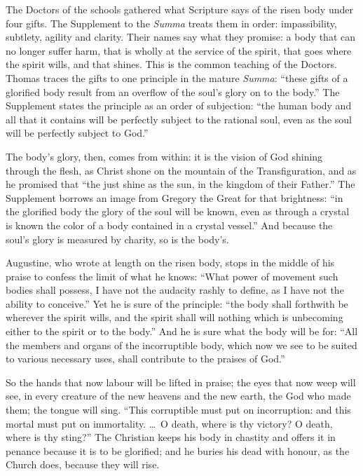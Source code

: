 The Doctors of the schools gathered what Scripture says of the risen body under four gifts. The Supplement to the \emph{Summa} treats them in order: impassibility, subtlety, agility and clarity. Their names say what they promise: a body that can no longer suffer harm, that is wholly at the service of the spirit, that goes where the spirit wills, and that shines. This is the common teaching of the Doctors. Thomas traces the gifts to one principle in the mature \emph{Summa}: ``these gifts of a glorified body result from an overflow of the soul's glory on to the body.'' The Supplement states the principle as an order of subjection: ``the human body and all that it contains will be perfectly subject to the rational soul, even as the soul will be perfectly subject to God.''

The body's glory, then, comes from within: it is the vision of God shining through the flesh, as Christ shone on the mountain of the Transfiguration, and as he promised that ``the just shine as the sun, in the kingdom of their Father.'' The Supplement borrows an image from Gregory the Great for that brightness: ``in the glorified body the glory of the soul will be known, even as through a crystal is known the color of a body contained in a crystal vessel.'' And because the soul's glory is measured by charity, so is the body's.

Augustine, who wrote at length on the risen body, stops in the middle of his praise to confess the limit of what he knows: ``What power of movement such bodies shall possess, I have not the audacity rashly to define, as I have not the ability to conceive.'' Yet he is sure of the principle: ``the body shall forthwith be wherever the spirit wills, and the spirit shall will nothing which is unbecoming either to the spirit or to the body.'' And he is sure what the body will be for: ``All the members and organs of the incorruptible body, which now we see to be suited to various necessary uses, shall contribute to the praises of God.''

So the hands that now labour will be lifted in praise; the eyes that now weep will see, in every creature of the new heavens and the new earth, the God who made them; the tongue will sing. ``This corruptible must put on incorruption: and this mortal must put on immortality. \ldots\ O death, where is thy victory? O death, where is thy sting?'' The Christian keeps his body in chastity and offers it in penance because it is to be glorified; and he buries his dead with honour, as the Church does, because they will rise.
